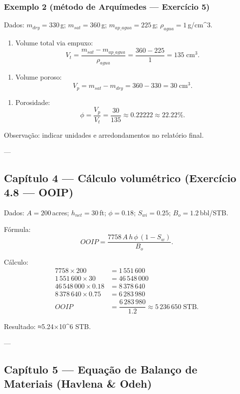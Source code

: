 \documentclass[11pt,a4paper]{article}
\begin{document}
\subsubsection{Exemplo 2 (método de Arquímedes — Exercício 5)}
Dados: $m_{dry}=330\,$g; $m_{sat}=360\,$g; $m_{ap\_agua}=225\,$g; $\rho_{agua}=1\,$g/cm^3.

\begin{enumerate}
\item Volume total via empuxo:
$$V_t=\dfrac{m_{sat}-m_{ap\_agua}}{\rho_{agua}}=\dfrac{360-225}{1}=135\;\text{cm}^3.$$ 
\end{enumerate}

\begin{enumerate}
\item Volume poroso:
$$V_p=m_{sat}-m_{dry}=360-330=30\;\text{cm}^3.$$ 
\end{enumerate}

\begin{enumerate}
\item Porosidade:
$$\phi=\dfrac{V_p}{V_t}=\dfrac{30}{135}\approx0.22222\approx22.22\%.$$
\end{enumerate}

Observação: indicar unidades e arredondamentos no relatório final.

---

\subsection{Capítulo 4 — Cálculo volumétrico (Exercício 4.8 — OOIP)}
Dados: $A=200\,$acres; $h_{net}=30\,$ft; $\phi=0.18$; $S_{wi}=0.25$; $B_o=1.2\,$bbl/STB.

Fórmula:
$$OOIP=\dfrac{7758\,A\,h\,\phi\,(1-S_w)}{B_o}.$$ 

Cálculo:
\begin{align*}
7758\times200&=1\,551\,600\\
1\,551\,600\times30&=46\,548\,000\\
46\,548\,000\times0.18&=8\,378\,640\\
8\,378\,640\times0.75&=6\,283\,980\\
OOIP&=\dfrac{6\,283\,980}{1.2}\approx5\,236\,650\;\text{STB}.
\end{align*}

Resultado: ≈5.24×10^6 STB.

---

\subsection{Capítulo 5 — Equação de Balanço de Materiais (Havlena & Odeh)}
\end{document}
